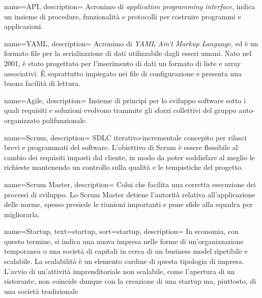  {
  name=API,
  description={
Acronimo di \textit{application programming interface}, indica un insieme
di procedure, funzionalità e protocolli per costruire programmi e applicazioni.
}
}

 {
  name=YAML,
  description={
Acronimo di \textit{YAML Ain't Markup Language}, ed è un formato file
per la serializzzione di dati utilizzabile dagli esseri umani. Nato nel 2001,
è stato progettato per l'inserimento di dati un formato di liste e array
associativi. È soprattutto impiegato nei file di configurazione e
presenta una buona facilità di lettura.
}
}

 {
  name=Agile,
  description={
Insieme di principi per lo sviluppo software sotto i quali requisiti e
soluzioni evolvono trammite gli sforzi collettivi del gruppo auto-organizzato
polifunzionale.
}
}

 {
  name=Scrum,
  description={
SDLC iterativo-incrementale concepito per rilasci brevi e programmati del
software. L'obiettivo di Scrum è essere flessibile al cambio dei requisiti
imposti dal cliente, in modo da poter soddisfare al meglio le richieste
mantenendo un controllo sulla qualità e le tempistiche del progetto.
}
}

 {
  name=Scrum Master,
  description={
Colui che facilita una corretta esecuzione dei processi di sviluppo. Lo Scrum
Master detiene l'autorità relativa all'applicazione delle norme, spesso
presiede le riunioni importanti e pone sfide alla squadra per migliorarla.
}
}

{
  name=Startup,
  text=startup,
  sort=startup,
  description={
In economia, con questo termine, si indica una nuova impresa
nelle forme di un'organizzazione temporanea o una società di capitali in cerca
di un business model ripetibile e scalabile.
La scalabilità è un elemento cardine di questa tipologia di impresa. L'avvio di
un'attività imprenditoriale non scalabile, come l'apertura di un ristorante,
non coincide dunque con la creazione di una startup ma, piuttosto, di una
società tradizionale
}
}


